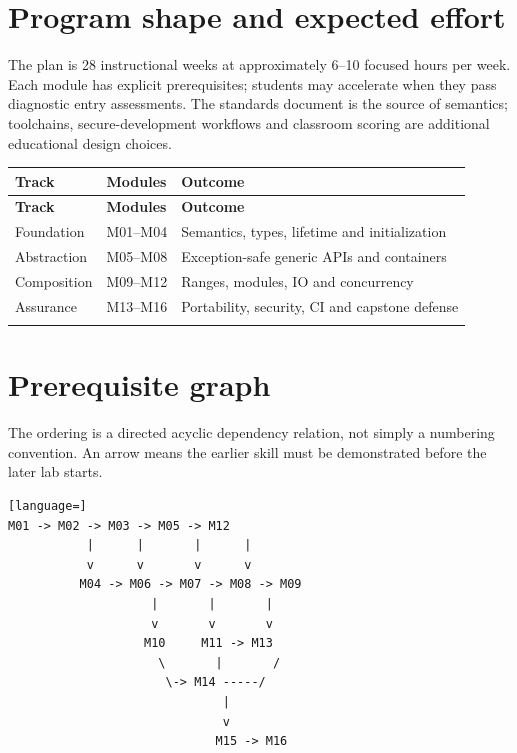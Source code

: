 \documentclass[11pt]{article}
\begin{document}
\docfront
\section{Program shape and expected effort}
The plan is 28 instructional weeks at approximately 6--10 focused hours per week. Each module has explicit prerequisites; students may accelerate when they pass diagnostic entry assessments. The standards document is the source of semantics; toolchains, secure-development workflows and classroom scoring are additional educational design choices.

\small
\begin{longtable}{@{}>{\raggedright\arraybackslash}p{.22\linewidth}>{\raggedright\arraybackslash}p{.34\linewidth}>{\raggedright\arraybackslash}p{}@{}}
\toprule
\textbf{Track} & \textbf{Modules} & \textbf{Outcome}\\
\midrule
\endfirsthead
\toprule
\textbf{Track} & \textbf{Modules} & \textbf{Outcome}\\
\midrule
\endhead
Foundation & M01--M04 & Semantics, types, lifetime and initialization\\
\addlinespace[2pt]
Abstraction & M05--M08 & Exception-safe generic APIs and containers\\
\addlinespace[2pt]
Composition & M09--M12 & Ranges, modules, IO and concurrency\\
\addlinespace[2pt]
Assurance & M13--M16 & Portability, security, CI and capstone defense\\
\addlinespace[2pt]
\bottomrule
\end{longtable}
\normalsize
\section{Prerequisite graph}
The ordering is a directed acyclic dependency relation, not simply a numbering convention. An arrow means the earlier skill must be demonstrated before the later lab starts.

\begin{lstlisting}[language=]
M01 -> M02 -> M03 -> M05 -> M12
           |      |       |      |
           v      v       v      v
          M04 -> M06 -> M07 -> M08 -> M09
                    |       |       |
                    v       v       v
                   M10     M11 -> M13
                     \       |       /
                      \-> M14 -----/
                              |
                              v
                             M15 -> M16
\end{lstlisting}
\end{document}
